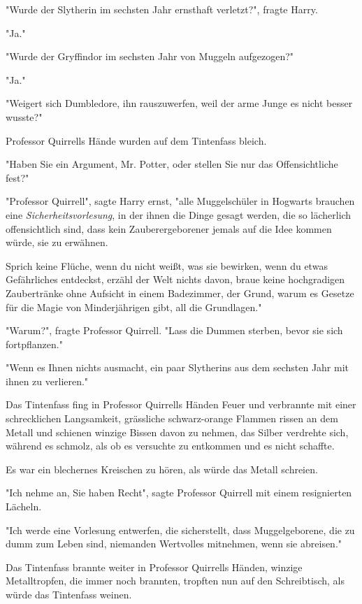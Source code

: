 {"Wurde der Slytherin im sechsten Jahr ernsthaft verletzt?", fragte Harry.

"Ja."

"Wurde der Gryffindor im sechsten Jahr von Muggeln aufgezogen?"

"Ja."

"Weigert sich Dumbledore, ihn rauszuwerfen, weil der arme Junge es nicht besser wusste?"

Professor Quirrells Hände wurden auf dem Tintenfass bleich.

"Haben Sie ein Argument, Mr. Potter, oder stellen Sie nur das Offensichtliche fest?"

"Professor Quirrell", sagte Harry ernst, "alle Muggelschüler in Hogwarts brauchen eine \emph{Sicherheitsvorlesung}, in der ihnen die Dinge gesagt werden, die so lächerlich offensichtlich sind, dass kein Zauberergeborener jemals auf die Idee kommen würde, sie zu erwähnen.

Sprich keine Flüche, wenn du nicht weißt, was sie bewirken, wenn du etwas Gefährliches entdeckst, erzähl der Welt nichts davon, braue keine hochgradigen Zaubertränke ohne Aufsicht in einem Badezimmer, der Grund, warum es Gesetze für die Magie von Minderjährigen gibt, all die Grundlagen."

"Warum?", fragte Professor Quirrell. "Lass die Dummen sterben, bevor sie sich fortpflanzen."

"Wenn es Ihnen nichts ausmacht, ein paar Slytherins aus dem sechsten Jahr mit ihnen zu verlieren."

Das Tintenfass fing in Professor Quirrells Händen Feuer und verbrannte mit einer schrecklichen Langsamkeit, grässliche schwarz-orange Flammen rissen an dem Metall und schienen winzige Bissen davon zu nehmen, das Silber verdrehte sich, während es schmolz, als ob es versuchte zu entkommen und es nicht schaffte.

Es war ein blechernes Kreischen zu hören, als würde das Metall schreien.

"Ich nehme an, Sie haben Recht", sagte Professor Quirrell mit einem resignierten Lächeln.

"Ich werde eine Vorlesung entwerfen, die sicherstellt, dass Muggelgeborene, die zu dumm zum Leben sind, niemanden Wertvolles mitnehmen, wenn sie abreisen."

Das Tintenfass brannte weiter in Professor Quirrells Händen, winzige Metalltropfen, die immer noch brannten, tropften nun auf den Schreibtisch, als würde das Tintenfass weinen.

}

